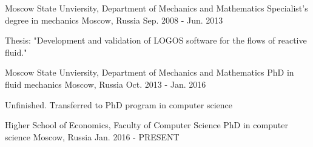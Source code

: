 \begin{cventries}
  \cventry
    {Moscow State Unviersity, Department of Mechanics and Mathematics}
    {Specialist's degree in mechanics}
    {Moscow, Russia}
    {Sep. 2008 - Jun. 2013}
    {
      \begin{cvitems}
        \item{Thesis: "Development and validation of LOGOS software for the flows of reactive fluid."}
      \end{cvitems}
    }
  \cventry
    {Moscow State Unviersity, Department of Mechanics and Mathematics}
    {PhD in fluid mechanics}
    {Moscow, Russia}
    {Oct. 2013 - Jan. 2016}
    {
      \begin{cvitems}
        \item {Unfinished. Transferred to PhD program in computer science}
      \end{cvitems}
    }
  \cventry
    {Higher School of Economics, Faculty of Computer Science}
    {PhD in computer science}
    {Moscow, Russia}
    {Jan. 2016 - PRESENT}
    {
    }
\end{cventries}
